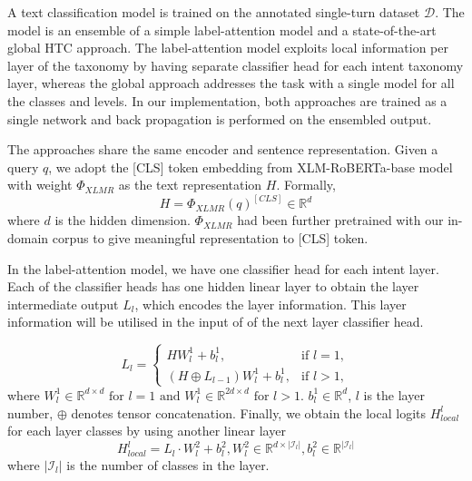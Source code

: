 A text classification model is trained on the annotated single-turn dataset $\mathcal{D}$. The model is an ensemble of a simple label-attention model and a state-of-the-art global HTC approach. The label-attention model exploits local information per layer of the taxonomy by having separate classifier head for each intent taxonomy layer, whereas the global approach addresses the task with a single model for all the classes and levels. In our implementation, both approaches are trained as a single network and back propagation is performed on the ensembled output.

The approaches share the same encoder and sentence representation. Given a query $q$, we adopt the [CLS] token embedding from XLM-RoBERTa-base model with weight $\Phi_{XLMR}$ as the text representation $H$. Formally, 
$$ H = \Phi_{XLMR}(q)^{[CLS]} \in \mathbb{R}^{d} $$ where $d$ is the hidden dimension. 
$\Phi_{XLMR}$ had been further pretrained with our in-domain corpus to give meaningful representation to [CLS] token. 

In the label-attention model, we have one classifier head for each intent layer. Each of the classifier heads has one hidden linear layer to obtain the layer intermediate output $L_l$, which encodes the layer information. This layer information will be utilised in the input of of the next layer classifier head. 

\[
    L_l = 
    \begin{cases}
        HW^1_l + b^1_l, & \text{if } l = 1, \\
        (H \oplus L_{l-1})W^1_l + b^1_l, & \text{if } l > 1,
    \end{cases}
\]
where \( W^1_l \in \mathbb{R}^{d \times d} \text{ for } l = 1 \text{ and } W^1_l \in \mathbb{R}^{2d \times d} \text{ for } l > 1 \). $b^1_l \in \mathbb{R}^d$, $l$ is the layer number, $\oplus$ denotes tensor concatenation. Finally, we obtain the local logits $H_{local}^l$ for each layer classes by using another linear layer
$$ H_{local}^l = L_l \cdot W^2_l + b^2_l, W^2_l \in \mathbb{R}^{d \times |\mathcal{I}_l|}, b^2_l \in \mathbb{R}^{|\mathcal{I}_l|} $$
where $|\mathcal{I}_l|$ is the number of classes in the layer. 

